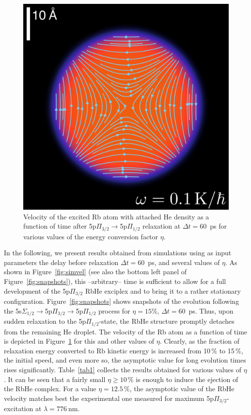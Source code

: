 \begin{figure}[!]
	\includegraphics[width=1.0\linewidth,clip=true]{fig8}
	\caption{\label{fig:speed_eta} Velocity of the excited Rb atom with attached He density as a function of time after 5p$\Pi_{3/2} \rightarrow$5p$\Pi_{1/2}$ relaxation at $\Delta t=60$~ps for various values of the energy conversion factor $\eta$.}
\end{figure}
In the following, we present results obtained from simulations using as input parameters the delay before relaxation $\Delta t=60$~ps, and several values of $\eta$. As shown in Figure~\ref{fig:simvel} (see also the bottom left panel of Figure~\ref{fig:snapshots}), this --arbitrary--  time is sufficient to allow for a full development of the 5p$\Pi_{3/2}$ RbHe exciplex and to bring it to a rather stationary configuration. Figure~\ref{fig:snapshots} shows snapshots of the evolution following the 5s$\Sigma_{1/2}\rightarrow$5p$\Pi_{3/2}\rightarrow$5p$\Pi_{1/2}$ process for $\eta=15$\%, $\Delta t=60$~ps. Thus, upon sudden relaxation to the 5p$\Pi_{1/2}$-state, the RbHe structure promptly detaches from the remaining He droplet. The velocity of the Rb atom as a function of time is depicted in Figure~\ref{fig:speed_eta} for this and other values of $\eta$. Clearly, as the fraction of relaxation energy converted to Rb kinetic energy is increased from 10\,\% to 15\,\%, the initial speed, and even more so, the asymptotic value for long evolution times rises significantly. Table~\ref{tab1} collects the results obtained for various values of $\eta$. It can be seen that a fairly small $\eta\geq 10\,$\% is enough to induce the ejection of the RbHe complex. For a value $\eta = 12.5\,$\%, the asymptotic value of the RbHe velocity matches best the experimental one measured for maximum 5p$\Pi_{3/2}$-excitation at $\lambda = 776~$nm. 

